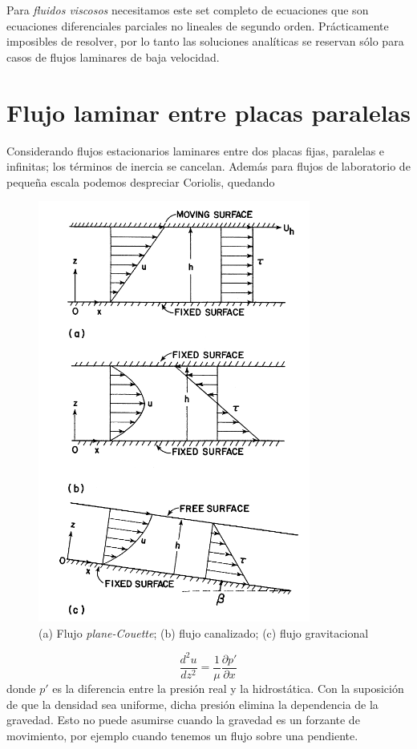 \documentclass[openany]{book}
\begin{document}
\par Para \emph{fluidos viscosos} necesitamos este set completo de 
ecuaciones que son ecuaciones diferenciales parciales no lineales de 
segundo orden. Prácticamente imposibles de resolver, por lo tanto las 
soluciones analíticas se reservan sólo para casos de flujos laminares 
de baja velocidad.

\section{Flujo laminar entre placas paralelas}
Considerando flujos estacionarios laminares entre dos placas
fijas, paralelas e infinitas; los términos de inercia se cancelan. Además 
para flujos de laboratorio de pequeña escala podemos despreciar
Coriolis, quedando

\begin{figure}[htb]
    \centering
    \includegraphics[width=0.6\linewidth]{img/laminar-fluxes.png}
    \caption{(a) Flujo \emph{plane-Couette}; (b) flujo canalizado;
    (c) flujo gravitacional}
    \label{fig:laminar-flows}
\end{figure}


\begin{equation}
    \frac{d^2u}{dz^2}=\frac{1}{\mu}\frac{\partial p'}{\partial x}
\end{equation}
donde $p'$ es la diferencia entre la presión real y la
hidrostática. Con la suposición de que la densidad sea uniforme,
dicha presión elimina la dependencia de la gravedad. Esto no
puede asumirse cuando la gravedad es un forzante de movimiento,
por ejemplo cuando tenemos un flujo sobre una pendiente.
\end{document}

